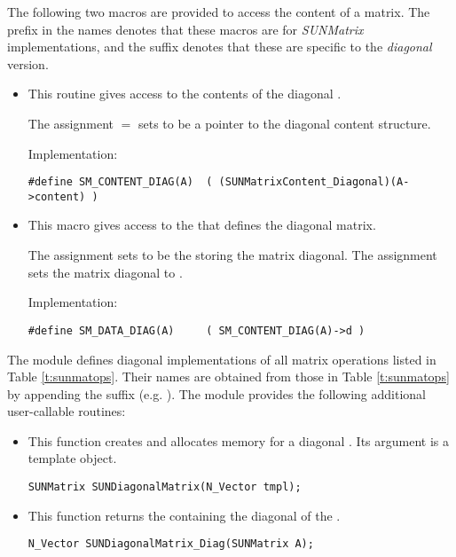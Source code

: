 \noindent The following two macros are provided to access the
content of a {\sunmatdiag} matrix. The prefix  in the names
denotes that these macros are for \emph{SUNMatrix} implementations,
and the suffix  denotes that these are specific to
the \emph{diagonal} version.
\begin{itemize}

\item {}
    
  This routine gives access to the contents of the
  diagonal .
  
  The assignment  $=$  sets
   to be a pointer to the diagonal  content
  structure.                                             
                                                            
  Implementation: 
  
  \verb|#define SM_CONTENT_DIAG(A)  ( (SUNMatrixContent_Diagonal)(A->content) )|
  
\item {}
                                                            
  This macro gives access to the {\nvector}  that defines the
  diagonal matrix.

  The assignment  sets  to be     
  the {\nvector} storing the matrix diagonal.  The
  assignment  sets the {\nvector}
  matrix diagonal to .
  
  Implementation:

  \verb|#define SM_DATA_DIAG(A)     ( SM_CONTENT_DIAG(A)->d )|

\end{itemize}
The {\sunmatdiag} module defines diagonal implementations of all
matrix operations listed in Table \ref{t:sunmatops}. Their names are
obtained from those in Table \ref{t:sunmatops} by appending the
suffix  (e.g. ). 
The module {\sunmatdiag} provides the following additional
user-callable routines: 
\begin{itemize}


\item {}

  This function creates and allocates memory for a diagonal .
  Its argument is a template {\nvector} object.

  \verb|SUNMatrix SUNDiagonalMatrix(N_Vector tmpl);|


\item {}

  This function returns the {\nvector} containing the diagonal of
  the . 
 
  \verb|N_Vector SUNDiagonalMatrix_Diag(SUNMatrix A);|

\end{itemize}
